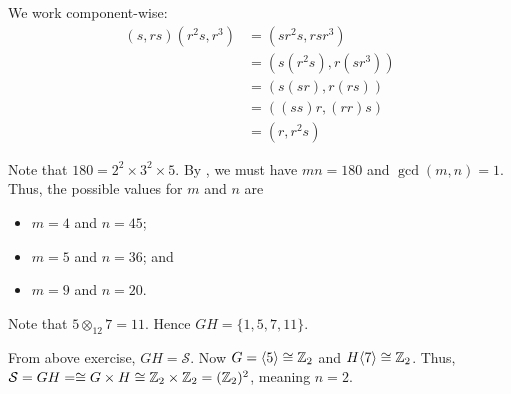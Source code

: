 \begin{questions}
    \item We work component-wise:
    \begin{align*}
        (s, rs)(r^2s, r^3) &= (sr^2s, rsr^3)\\
        &= (s(r^2s), r(sr^3))\\
        &= (s(sr), r(rs))\\
        &= ((ss)r, (rr)s)\\
        &= (r, r^2s)
    \end{align*}

    \item Note that $180 = 2^2 \times 3^2 \times 5$. By , we must have $mn = 180$ and $\gcd(m, n) = 1$. Thus, the possible values for $m$ and $n$ are
    \begin{itemize}
        \item $m = 4$ and $n = 45$;
        \item $m = 5$ and $n = 36$; and
        \item $m = 9$ and $n = 20$.
    \end{itemize}

    \item Note that $5 \otimes_{12} 7 = 11$. Hence $GH = \{1, 5, 7, 11\}$.

    \item From above exercise, $GH = \mathcal{S}$. Now $G = \langle 5 \rangle \cong \mathbb{Z}_2$ and $H \langle 7 \rangle \cong \mathbb{Z}_2$. Thus, $\mathcal{S} = GH = \cong G \times H \cong \mathbb{Z}_2 \times \mathbb{Z}_2 = (\mathbb{Z}_2)^2$, meaning $n = 2$.
\end{questions}
